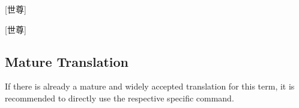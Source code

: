 
[世尊]


[世尊]

\subsection{Mature Translation}
If there is already a mature and widely accepted translation for this term, it is recommended to directly use the respective specific command.





